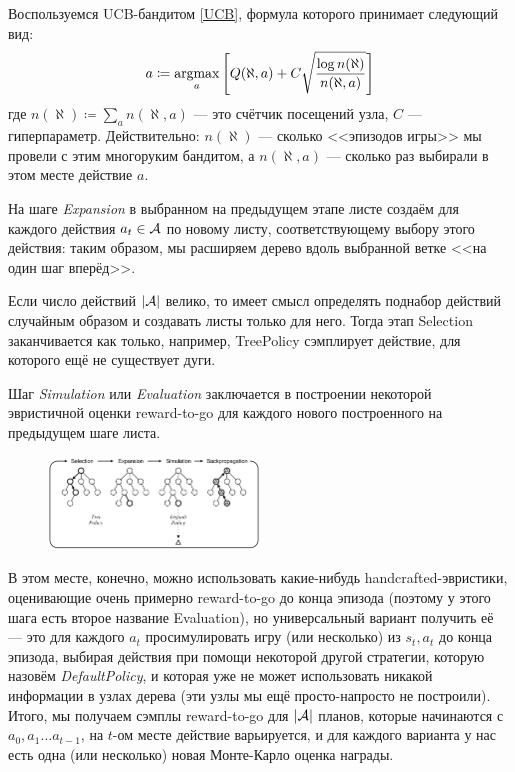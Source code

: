 \begin{example} Воспользуемся UCB-бандитом \eqref{UCB}, формула которого принимает следующий вид:
$$a \coloneqq \mathop{\mathrm{argmax}}_a \left[ Q(\aleph, a) + C \sqrt{\frac{\log n(\aleph)}{n(\aleph, a)}}\right]$$
где $n(\aleph) \coloneqq \sum\limits_a n(\aleph, a)$ --- это счётчик посещений узла, $C$ --- гиперпараметр. Действительно: $n(\aleph)$ --- сколько <<эпизодов игры>> мы провели с этим многоруким бандитом, а $n(\aleph, a)$ --- сколько раз выбирали в этом месте действие $a$. 
\end{example}

\begin{definition}
    На шаге \emph{Expansion} в выбранном на предыдущем этапе листе создаём для каждого действия $a_t \HM\in \A$ по новому листу, соответствующему выбору этого действия: таким образом, мы расширяем дерево вдоль выбранной ветке <<на один шаг вперёд>>.
\end{definition}

\begin{remark}
Если число действий $|\mathcal{A}|$ велико, то имеет смысл определять поднабор действий случайным образом и создавать листы только для него. Тогда этап Selection заканчивается как только, например, TreePolicy сэмплирует действие, для которого ещё не существует дуги.
\end{remark}

\begin{definition}
    Шаг \emph{Simulation} или \emph{Evaluation} заключается в построении некоторой эвристичной оценки reward-to-go для каждого нового построенного на предыдущем шаге листа.
\end{definition}

\begin{figure}
\vspace{-0.3cm}
\centering
\includegraphics[width=0.5\textwidth]{Images/MCTS.png}
\vspace{-0.3cm}
\end{figure}

В этом месте, конечно, можно использовать какие-нибудь handcrafted-эвристики, оценивающие очень примерно reward-to-go до конца эпизода (поэтому у этого шага есть второе название Evaluation), но универсальный вариант получить её --- это для каждого $a_t$ просимулировать игру (или несколько) из $s_t, a_t$ до конца эпизода, выбирая действия при помощи некоторой другой стратегии, которую назовём \emph{DefaultPolicy}, и которая уже не может использовать никакой информации в узлах дерева (эти узлы мы ещё просто-напросто не построили). Итого, мы получаем сэмплы reward-to-go для $|\mathcal{A}|$ планов, которые начинаются с $a_0, a_1 \dots a_{t-1}$, на $t$-ом месте действие варьируется, и для каждого варианта у нас есть одна (или несколько) новая Монте-Карло оценка награды.

